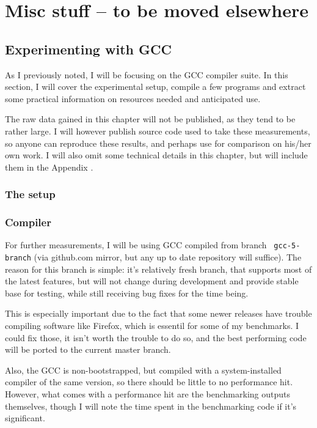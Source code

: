 \chapter{Misc stuff -- to be moved elsewhere}
\section{Experimenting with GCC}

As I previously noted, I will be focusing on the GCC compiler suite. In this
section, I will cover the experimental setup, compile a few programs and extract
some practical information on resources needed and anticipated use.

The raw data gained in this chapter will not be published, as they tend to be
rather large. I will however publish source code used to take these
measurements, so anyone can reproduce these results, and perhaps use for
comparison on his/her own work. I will also omit some technical details in this
chapter, but will include them in the Appendix .

\subsection{The setup}

\subsection{Compiler}

For further measurements, I will be using GCC compiled from branch {\tt
gcc-5-branch} (via github.com mirror, but any up to date repository will
suffice). The reason for this branch is simple: it's relatively fresh branch,
that supports most of the latest features, but will not change during
development and provide stable base for testing, while still receiving bug fixes
for the time being.

This is especially important due to the fact that some newer releases have
trouble compiling software like Firefox, which is essentil for some of my
benchmarks. I could fix those, it isn't worth the trouble to do so, and the best
performing code will be ported to the current master branch.

Also, the GCC is non-bootstrapped, but compiled with a system-installed compiler
of the same version, so there should be little to no performance hit. However,
what comes with a performance hit are the benchmarking outputs themselves,
though I will note the time spent in the benchmarking code if it's significant.

